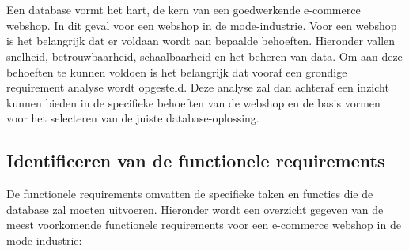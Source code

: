\chapter{}%
\label{ch:requirement-analyse}

Een database vormt het hart, de kern van een goedwerkende e-commerce webshop. In dit geval voor een webshop in de mode-industrie. Voor een webshop is het belangrijk dat er voldaan wordt aan bepaalde behoeften. Hieronder vallen snelheid, betrouwbaarheid, schaalbaarheid en het beheren van data. Om aan deze behoeften te kunnen voldoen is het belangrijk dat vooraf een grondige requirement analyse wordt opgesteld. Deze analyse zal dan achteraf een inzicht kunnen bieden in de specifieke behoeften van de webshop en de basis vormen voor het selecteren van de juiste database-oplossing.

\section{Identificeren van de functionele requirements}
\label{sec:functionele-requirements}
De functionele requirements omvatten de specifieke taken en functies die de database zal moeten uitvoeren. Hieronder wordt een overzicht gegeven van de meest voorkomende functionele requirements voor een e-commerce webshop in  de mode-industrie:

